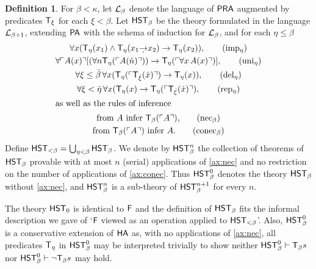 \documentclass[UKenglish,cleveref,DIV=12]{scrartcl}
\theoremstyle{definition}
\newtheorem{definition}[lemma]{Definition}
\theoremstyle{definition}
\begin{document}
\begin{definition}%
For $\beta<\kappa$, let $\mathcal{L}_\beta$ denote the language of $\mathsf{PRA}$ augmented by
predicates  $\mathsf{T}_\xi$ for each $\xi < \beta$. Let $\mathsf{HST}_\beta$ be the theory
formulated in the language $\mathcal{L}_{\beta+1}$, extending $\mathsf{PA}$ with the schema of
induction for $\mathcal{L}_\beta$, and for each $\eta\le\beta$
\begin{gather}
  \forall x(\T_\eta(x_1)\land \T_\eta(x_1\dimplies x_2)\rightarrow \T_\eta(x_2)),
	  \tag{\Imp{\eta}}\label{ax:imp}\\
  \forall\gn {A(x)}[(\forall n \T_\eta(\gn{A(\dot n)}))\rightarrow
	\T_{\eta}(\gn{\forall x \,A(x)})],
	  \tag{uni$_\eta$}\label{ax:uni}\\
  \forall \xi\le\bar\beta\,\forall x( \T_\eta(\gn{\T_{\dot{\xi}}(\dot
	x)})\rightarrow \T_\eta(x)),
	  \tag{\Del{\eta}}\label{ax:del}\\
  \forall \xi<\bar\eta \,\forall x(\T_\eta(x)\rightarrow\T_\eta(\gn{
	  \T_{\dot{\xi}}(\dot x)}),
	  \tag{\Rep{\eta}}\label{ax:rep}\\
\intertext{as well as the rules of inference}
  \text{from $A$ infer $\T_\beta(\gn A)$,}\tag{nec$_\beta$}
	  \label{ax:nec}\\
  \text{from $\T_\beta(\gn A)$ infer $A$.}\tag{conec$_\beta$}
	  \label{ax:conec}
\end{gather}
Define $\mathsf{HST}_{<\beta}=\bigcup_{\eta<\beta}\mathsf{HST}_\beta$. 
We denote by $\mathsf{HST}_\beta^n$ the collection of theorems of $\mathsf{HST}_\beta$ provable with at most $n$ (serial) applications
of \eqref{ax:nec} and no restriction on the number of applications of
\eqref{ax:conec}. 
Thus $\mathsf{HST}_\beta^0$ denotes the theory $\mathsf{HST}_\beta$ without
\eqref{ax:nec}, and
$\mathsf{HST}_\beta^n$ is a sub-theory of $\mathsf{HST}_\beta^{n+1}$ for every $n$.
\end{definition}

The theory $\mathsf{HST}_0$ is identical to $\mathsf{F}$ and the definition of $\mathsf{HST}_{\beta}$ fits
the informal description we gave of `$\mathsf{F}$ viewed as an operation applied to
$\mathsf{HST}_{<\beta}$'. Also, $\mathsf{HST}_\beta^0$ is a conservative extension of
$\mathsf{HA}$ as, with no applications of \eqref{ax:nec}, all predicates $\mathsf{T}_\eta$ in
$\mathsf{HST}_\beta^0$ may be interpreted trivially to show neither $\mathsf{HST}_\beta^0\vdash
\mathsf{T}_\beta s$ nor $\mathsf{HST}_\beta^0\vdash \lnot \mathsf{T}_\beta s$ may hold.
\end{document}
